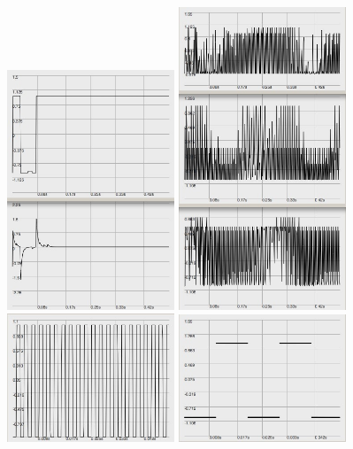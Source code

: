 \documentclass[letterpaper, 12pt]{article}
\begin{document}
\begin{figure}
	\centering
		\includegraphics[width=5cm]{wv-POPdestroy-noRandom}
		\includegraphics[width=5cm]{wv-POPdestroy-random}
		\includegraphics[width=5cm]{wv-impulse}
		\includegraphics[width=5cm]{wv-pulse202}

\end{figure}
\end{document}
